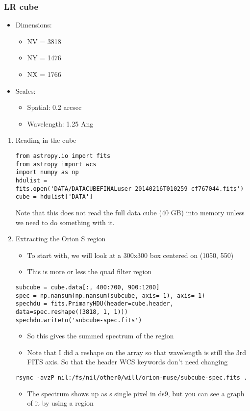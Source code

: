 \documentclass[11pt]{article}
\begin{document}
\subsubsection{LR cube}
\label{sec:orgheadline48}
\begin{itemize}
\item Dimensions:
\begin{itemize}
\item NV = 3818
\item NY = 1476
\item NX = 1766
\end{itemize}
\item Scales:
\begin{itemize}
\item Spatial: 0.2 arcsec
\item Wavelength: 1.25 Ang
\end{itemize}
\end{itemize}
\begin{enumerate}
\item Reading in the cube
\label{sec:orgheadline46}
\begin{verbatim}
from astropy.io import fits
from astropy import wcs
import numpy as np
hdulist = fits.open('DATA/DATACUBEFINALuser_20140216T010259_cf767044.fits')
cube = hdulist['DATA']
\end{verbatim}
Note that this does not read the full data cube (40 GB) into memory unless we need to do something with it.
\item Extracting the Orion S region
\label{sec:orgheadline47}
\begin{itemize}
\item To start with, we will look at a 300x300 box centered on (1050, 550)
\item This is more or less the quad filter region
\end{itemize}
\begin{verbatim}
subcube = cube.data[:, 400:700, 900:1200]
spec = np.nansum(np.nansum(subcube, axis=-1), axis=-1)
spechdu = fits.PrimaryHDU(header=cube.header, data=spec.reshape((3818, 1, 1)))
spechdu.writeto('subcube-spec.fits')
\end{verbatim}
\begin{itemize}
\item So this gives the summed spectrum of the region
\item Note that I did a reshape on the array so that wavelength is still the 3rd FITS axis.  So that the header WCS keywords don't need changing
\end{itemize}
\begin{verbatim}
rsync -avzP nil:/fs/nil/other0/will/orion-muse/subcube-spec.fits .
\end{verbatim}
\begin{itemize}
\item The spectrum shows up as s single pixel in ds9, but you can see a graph of it by using a region
\end{itemize}
\end{enumerate}
\end{document}
